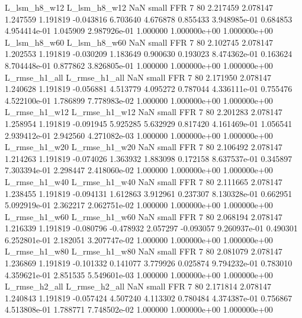   L_lsm_h8_w12   L_lsm_h8_w12                   NaN      small      FFR                 7 80 2.217459       2.078147 1.247559       1.191819   -0.043816      6.703640      4.676878     0.855433   3.948985e-01  0.684853 4.954414e-01     1.045909   2.987926e-01            1.000000    1.000000e+00        1.000000e+00
  L_lsm_h8_w60   L_lsm_h8_w60                   NaN      small      FFR                 7 80 2.102745       2.078147 1.202553       1.191819   -0.030209      1.183649      0.900630     0.193023   8.474362e-01  0.163624 8.704448e-01     0.877862   3.826805e-01            1.000000    1.000000e+00        1.000000e+00
 L_rmse_h1_all  L_rmse_h1_all                   NaN      small      FFR                 7 80 2.171950       2.078147 1.240628       1.191819   -0.056881      4.513779      4.095272     0.787044   4.336111e-01  0.755476 4.522100e-01     1.786899   7.778983e-02            1.000000    1.000000e+00        1.000000e+00
 L_rmse_h1_w12  L_rmse_h1_w12                   NaN      small      FFR                 7 80 2.201283       2.078147 1.258954       1.191819   -0.091945      5.925285      5.632929     0.817420   4.161469e-01  1.056541 2.939412e-01     2.942560   4.271082e-03            1.000000    1.000000e+00        1.000000e+00
 L_rmse_h1_w20  L_rmse_h1_w20                   NaN      small      FFR                 7 80 2.106492       2.078147 1.214263       1.191819   -0.074026      1.363932      1.883098     0.172158   8.637537e-01  0.345897 7.303394e-01     2.298447   2.418060e-02            1.000000    1.000000e+00        1.000000e+00
 L_rmse_h1_w40  L_rmse_h1_w40                   NaN      small      FFR                 7 80 2.111665       2.078147 1.238455       1.191819   -0.094131      1.612863      3.912961     0.237307   8.130328e-01  0.662951 5.092919e-01     2.362217   2.062751e-02            1.000000    1.000000e+00        1.000000e+00
 L_rmse_h1_w60  L_rmse_h1_w60                   NaN      small      FFR                 7 80 2.068194       2.078147 1.216339       1.191819   -0.080796     -0.478932      2.057297    -0.093057   9.260937e-01  0.490301 6.252801e-01     2.182051   3.207747e-02            1.000000    1.000000e+00        1.000000e+00
 L_rmse_h1_w80  L_rmse_h1_w80                   NaN      small      FFR                 7 80 2.081079       2.078147 1.236869       1.191819   -0.101332      0.141077      3.779926     0.025874   9.794232e-01  0.783010 4.359621e-01     2.851535   5.549601e-03            1.000000    1.000000e+00        1.000000e+00
 L_rmse_h2_all  L_rmse_h2_all                   NaN      small      FFR                 7 80 2.171814       2.078147 1.240843       1.191819   -0.057424      4.507240      4.113302     0.780484   4.374387e-01  0.756867 4.513808e-01     1.788771   7.748502e-02            1.000000    1.000000e+00        1.000000e+00
